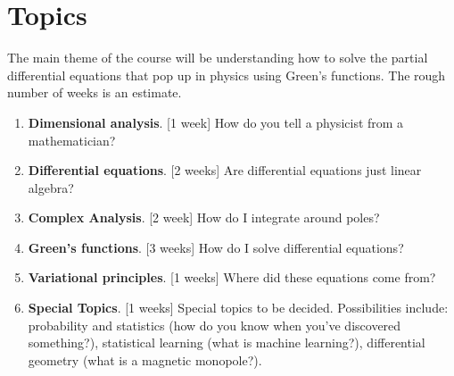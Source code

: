 \documentclass[12pt]{article}
\numberwithin{equation}{section}    %
\begin{document}
\section*{Topics}

The main theme of the course will be understanding how to solve the partial differential equations that pop up in physics using Green's functions. The rough number of weeks is an estimate.

\begin{enumerate}
	\item \textbf{Dimensional analysis}. [1 week] How do you tell a physicist from a mathematician?
	\item \textbf{Differential equations}. [2 weeks] Are differential equations just linear algebra?
	\item \textbf{Complex Analysis}. [2 week] How do I integrate around poles?
	\item \textbf{Green's functions}. [3 weeks] How do I solve differential equations? 
	\item \textbf{Variational principles}. [1 weeks] Where did these equations come from? 
	\item \textbf{Special Topics}. [1 weeks]  Special topics to be decided. Possibilities include: probability and statistics (how do you know when you've discovered something?), statistical learning (what is machine learning?), differential geometry (what is a magnetic monopole?).
\end{enumerate}

\end{document}
